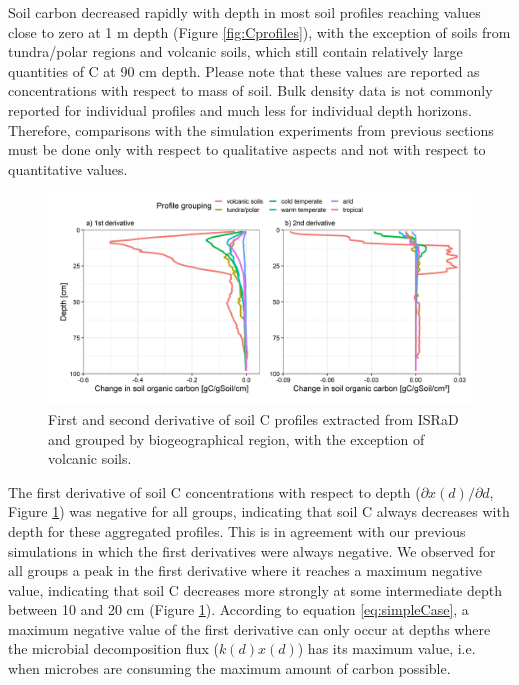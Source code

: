 \documentclass[11pt, oneside, a4paper]{article}   	%
\begin{document}
Soil carbon decreased rapidly with depth in most soil profiles reaching values close to zero at 1 m depth (Figure \ref{fig:Cprofiles}), with the exception of soils from tundra/polar regions and volcanic soils, which still contain relatively large quantities of C at 90 cm depth. Please note that these values are reported as concentrations with respect to mass of soil. Bulk density data is not commonly reported for individual profiles and much less for individual depth horizons. Therefore, comparisons with the simulation experiments from previous sections must be done only with respect to qualitative aspects and not with respect to quantitative values. 

\begin{figure}[htbp]
   \centering
   \includegraphics[width=\textwidth]{Figures/ISRaD_msp_14C_SOC_climate_depth_deriv_2023-03-13.jpeg} %
   \caption{First and second derivative of soil C profiles extracted from ISRaD and grouped by biogeographical region, with the exception of volcanic soils.}
   \label{fig:Derivatives}
\end{figure}

The first derivative of soil C concentrations with respect to depth ($\partial x(d)/ \partial d$, Figure \ref{fig:Derivatives})  was negative for all groups, indicating that soil C always decreases with depth for these aggregated profiles. This is in  agreement with our previous simulations in which the first derivatives were always negative. We observed for all groups a peak in the first derivative where it reaches a maximum negative value, indicating that soil C decreases more strongly at some intermediate depth between 10 and 20 cm (Figure \ref{fig:Derivatives}). According to equation \ref{eq:simpleCase}, a maximum negative value of the first derivative can only occur at depths where the microbial decomposition flux ($k(d) x(d)$) has its maximum value, i.e. when microbes are consuming the maximum amount of carbon possible.
\end{document}
